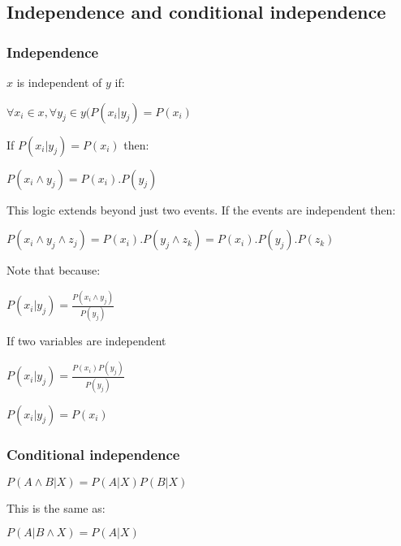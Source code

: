 
\subsection{Independence and conditional independence}

\subsubsection{Independence}

\(x\) is independent of \(y\) if:

\(\forall x_i \in x,\forall y_j \in y (P(x_i|y_j)=P(x_i)\)

If \(P(x_i|y_j)=P(x_i)\) then:

\(P(x_i\land y_j)=P(x_i).P(y_j)\)

This logic extends beyond just two events. If the events are independent then:

\(P(x_i\land y_j \land z_j)=P(x_i).P(y_j \land z_k)=P(x_i).P(y_j).P(z_k)\)

Note that because:

\(P(x_i|y_j)=\frac{P(x_i\land y_j)}{P(y_j)}\)

If two variables are independent

\(P(x_i|y_j)=\frac{P(x_i)P(y_j)}{P(y_j)}\)

\(P(x_i|y_j)=P(x_i)\)

\subsubsection{Conditional independence}

\(P(A\land B|X)=P(A|X)P(B|X)\)

This is the same as:

\(P(A|B\land X)=P(A|X)\)

